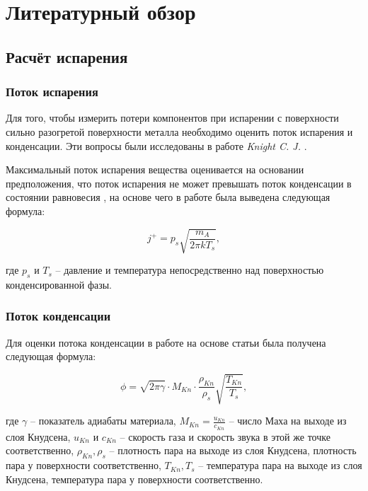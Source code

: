 \section{Литературный обзор}

\subsection{Расчёт испарения}

\subsubsection{Поток испарения}

Для того, чтобы измерить потери компонентов при испарении с поверхности сильно разогретой поверхности металла необходимо оценить поток испарения и конденсации. 
Эти вопросы были исследованы в работе \textit{Knight C. J.} \cite{knight1979theoretical}. 

Максимальный поток испарения вещества оценивается на основании предположения, что поток испарения не может превышать поток конденсации в состоянии равновесия \cite{hertz1882ueber}, на основе чего в работе \cite{langmuir1913vapor} была выведена следующая формула:

\begin{equation}
\label{eq:evap_max}
    j^+ = p_s\sqrt{\frac{m_A}{2\pi k T_s}},
\end{equation} 

\noindent
где $p_s$ и $T_s$ -- давление и температура непосредственно над поверхностью конденсированной фазы.

\subsubsection{Поток конденсации}

Для оценки потока конденсации в работе \cite{klassen2018simulation} на основе статьи \cite{knight1979theoretical} была получена следующая формула:

\begin{equation}
    \label{eq:evap_coeff}
    \phi = \sqrt{2\pi\gamma} \cdot M_{Kn} \cdot \frac{\rho_{Kn}}{\rho_s} \sqrt{\frac{T_{Kn}}{T_s}},
\end{equation}

\noindent
где $\gamma$ -- показатель адиабаты материала, $M_{Kn} = \frac{u_{Kn}}{c_{Kn}}$ -- число Маха на выходе из слоя Кнудсена, $u_{Kn}$ и $c_{Kn}$ -- скорость газа и скорость звука в этой же точке соответственно, $\rho_{Kn}, \rho_s$ -- плотность пара на выходе из слоя Кнудсена, плотность пара у поверхности соответственно, $ T_{Kn}, T_s$ -- температура пара на выходе из слоя Кнудсена, температура пара у поверхности соответственно.

